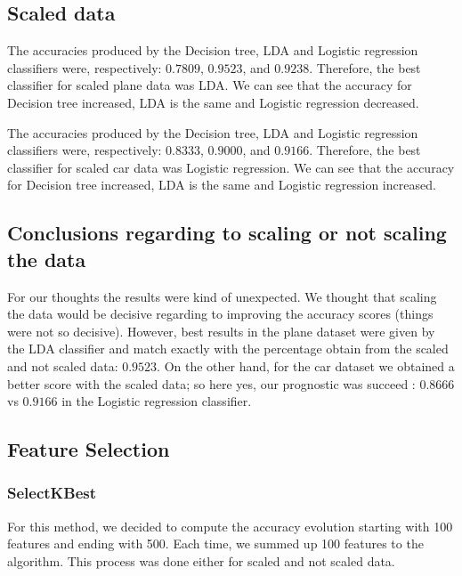 \documentclass{article} %
\begin{document}
\subsection{Scaled data}

The accuracies produced by the Decision tree, LDA and Logistic regression classifiers were, respectively: $0.7809$, $0.9523$, and $0.9238$. Therefore, the best classifier for scaled plane data was LDA. We can see that the accuracy for Decision tree increased, LDA is the same and Logistic regression decreased.

The accuracies produced by the Decision tree, LDA and Logistic regression classifiers were, respectively: $0.8333$, $0.9000$, and $0.9166$. Therefore, the best classifier for scaled car data was Logistic regression. We can see that the accuracy for Decision tree increased, LDA is the same and Logistic regression increased.

\subsection{Conclusions regarding to scaling or not scaling the data}
For our thoughts the results were kind of unexpected. We thought that scaling the data would be decisive regarding to improving the accuracy scores (things were not so decisive). However, best results in the plane dataset were given by the LDA classifier and match exactly with the percentage obtain from the scaled and not scaled data: $0.9523$. On the other hand, for the car dataset we obtained a better score with the scaled data; so here yes, our prognostic was succeed : $0.8666$ vs $0.9166$ in the Logistic regression classifier.

\subsection{Feature Selection}

\subsubsection{SelectKBest}

For this method, we decided to compute the accuracy evolution starting with 100 features and ending with 500. Each time, we summed up 100 features to the algorithm. This process was done either for scaled and not scaled data.
\end{document}

